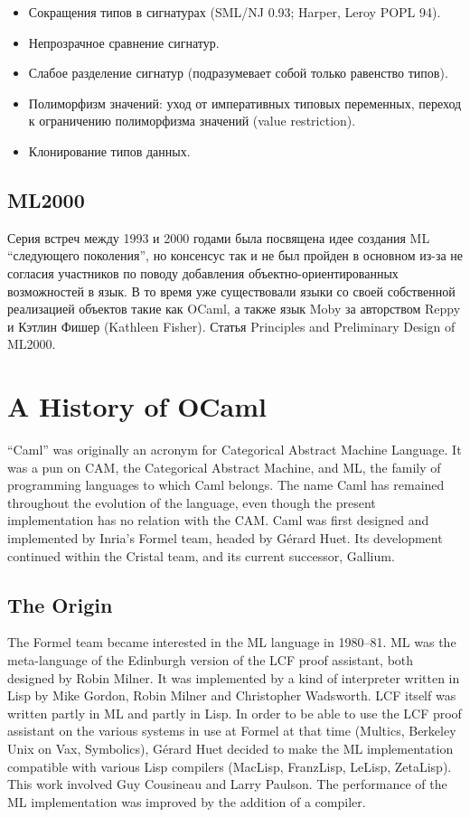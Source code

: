 \documentclass[14pt]{matmex-diploma-custom}
\begin{document}
\begin{itemize}
\item Сокращения типов в сигнатурах (SML/NJ 0.93; Harper, Leroy POPL 94).
\item Непрозрачное сравнение сигнатур.
\item Слабое разделение сигнатур (подразумевает собой только равенство типов).
\item Полиморфизм значений: уход от императивных типовых переменных, переход к ограничению полиморфизма значений (value restriction).
\item Клонирование типов данных.
\end{itemize}

\subsection{ML2000}
Серия встреч между 1993 и 2000 годами была посвящена идее создания ML “следующего поколения”, но консенсус так и не был пройден в основном из-за не согласия участников по поводу добавления объектно-ориентированных возможностей в язык. В то время уже существовали языки со своей собственной реализацией объектов такие как OCaml, а также язык Moby за авторством Reppy и Кэтлин Фишер (Kathleen Fisher). 
Статья Principles and Preliminary Design of ML2000. 


\section{A History of OCaml}
“Caml” was originally an acronym for Categorical Abstract Machine Language. It was a pun on CAM, the Categorical Abstract Machine, and ML, the family of programming languages to which Caml belongs. The name Caml has remained throughout the evolution of the language, even though the present implementation has no relation with the CAM.
Caml was first designed and implemented by Inria's Formel team, headed by Gérard Huet. Its development continued within the Cristal team, and its current successor, Gallium.
\subsection{The Origin}
The Formel team became interested in the ML language in 1980–81. ML was the meta-language of the Edinburgh version of the LCF proof assistant, both designed by Robin Milner. It was implemented by a kind of interpreter written in Lisp by Mike Gordon, Robin Milner and Christopher Wadsworth. LCF itself was written partly in ML and partly in Lisp. In order to be able to use the LCF proof assistant on the various systems in use at Formel at that time (Multics, Berkeley Unix on Vax, Symbolics), Gérard Huet decided to make the ML implementation compatible with various Lisp compilers (MacLisp, FranzLisp, LeLisp, ZetaLisp). This work involved Guy Cousineau and Larry Paulson. The performance of the ML implementation was improved by the addition of a compiler.
\end{document}
